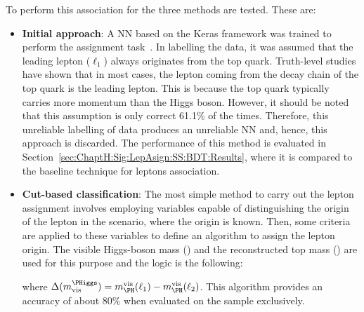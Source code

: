 To perform this association for the \dilepSStau three methods %
are tested. These are: %
\begin{itemize}
	\item \textbf{Initial approach}:  A NN based on the Keras framework 
	was trained to perform the assignment task~\cite{Walther:2743809}. 
	In labelling the data, it was assumed 
	that the leading lepton ($\ell_{1}$) always originates from the top quark. Truth-level studies have 
	shown that in most cases, the lepton coming from the decay chain of the top quark 
	is the leading lepton. This is because the top quark typically carries more momentum 
	than the Higgs boson. However, it should be noted that this assumption is only correct 
	61.1\% of the times. Therefore, this unreliable labelling of data produces an unreliable
	NN and, hence, this approach is discarded.
	The performance of this method is evaluated in Section~\ref{sec:ChaptH:Sig:LepAsign:SS:BDT:Results},
	where it is compared to the baseline technique for leptons association. 
	
	
	\item \textbf{Cut-based classification}: The most simple method to carry 
	out the lepton assignment involves employing variables capable of distinguishing 
	the origin of the lepton in the \dilepOStau scenario, where the origin is known. 
	Then, some criteria are applied to these variables to define an algorithm to
	assign the lepton origin. The visible Higgs-boson mass (\Hvismass) and the reconstructed 
	top mass (\toprecomass) are used for this purpose and the logic is the following:
	
	where $\Delta(m_{\text{vis}}^{\PHiggs}) = \Hvismass(\ell_{1}) - \Hvismass(\ell_{2})$. 
	This algorithm provides an accuracy of about 80\% when evaluated on the
	\dilepOStau sample exclusively.


\end{itemize}
